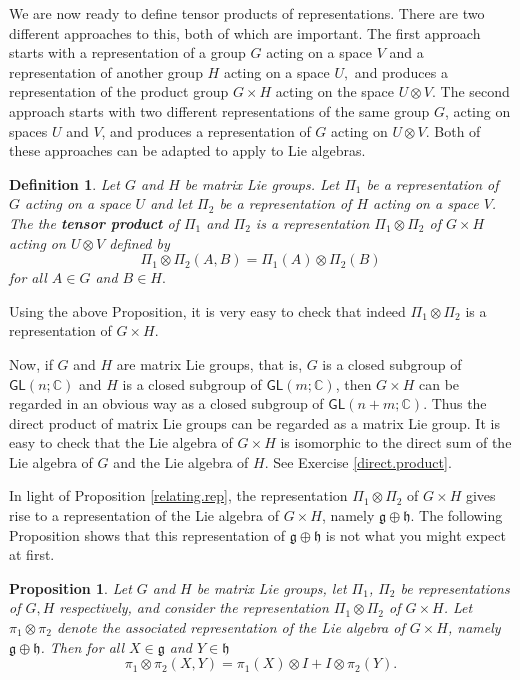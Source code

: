 \documentclass{amsbook}
\let \frak = \mathfrak
\theoremstyle{plain}
\newtheorem{definition}[theorem]{Definition}
\newtheorem{proposition}[theorem]{Proposition}
\numberwithin{equation}{chapter}
\numberwithin{theorem}{chapter}
\begin{document}
We are now ready to define tensor products of representations. There are two
different approaches to this, both of which are important. The first approach
starts with a representation of a group $G$ acting on a space $V$ and a
representation of another group $H$ acting on a space $U,$ and produces a
representation of the product group $G\times H$ acting on the space $U\otimes
V$. The second approach starts with two different representations of the same
group $G$, acting on spaces $U$ and $V$, and produces a representation of $G$
acting on $U\otimes V$. Both of these approaches can be adapted to apply to
Lie algebras.

\begin{definition}
\label{tensor.2}Let $G$ and $H$ be matrix Lie groups. Let $\Pi_{1}$ be a
representation of $G$ acting on a space $U$ and let $\Pi_{2}$ be a
representation of $H$ acting on a space $V$. The the \textbf{tensor product}
of $\Pi_{1}$ and $\Pi_{2}$ is a representation $\Pi_{1}\otimes\Pi_{2}$ of
$G\times H$ acting on $U\otimes V$ defined by
\[
\Pi_{1}\otimes\Pi_{2}(A,B)=\Pi_{1}(A)\otimes\Pi_{2}(B)
\]
for all $A\in G$ and $B\in H.$
\end{definition}

Using the above Proposition, it is very easy to check that indeed $\Pi
_{1}\otimes\Pi_{2}$ is a representation of $G\times H$.

Now, if $G$ and $H$ are matrix Lie groups, that is, $G$ is a closed subgroup
of $\mathsf{GL}(n;\mathbb{C})$ and $H$ is a closed subgroup of $\mathsf{GL}%
(m;\mathbb{C})$, then $G\times H$ can be regarded in an obvious way as a
closed subgroup of $\mathsf{GL}(n+m;\mathbb{C})$. Thus the direct product of
matrix Lie groups can be regarded as a matrix Lie group. It is easy to check
that the Lie algebra of $G\times H$ is isomorphic to the direct sum of the Lie
algebra of $G$ and the Lie algebra of $H$. See Exercise \ref{direct.product}.

In light of Proposition \ref{relating.rep}, the representation $\Pi_{1}%
\otimes\Pi_{2}$ of $G\times H$ gives rise to a representation of the Lie
algebra of $G\times H$, namely $\frak{g}\oplus\frak{h}$. The following
Proposition shows that this representation of $\frak{g}\oplus\frak{h}$ is not
what you might expect at first.

\begin{proposition}
Let $G$ and $H$ be matrix Lie groups, let $\Pi_{1}$, $\Pi_{2}$ be
representations of $G,H$ respectively, and consider the representation
$\Pi_{1}\otimes\Pi_{2}$ of $G\times H$. Let $\pi_{1}\otimes\pi_{2}$ denote the
associated representation of the Lie algebra of $G\times H$, namely
$\frak{g}\oplus\frak{h}$. Then for all $X\in\frak{g}$ and $Y\in\frak{h}$%
\[
\pi_{1}\otimes\pi_{2}(X,Y)=\pi_{1}(X)\otimes I+I\otimes\pi_{2}(Y)\text{.}%
\]
\end{proposition}
\end{document}
